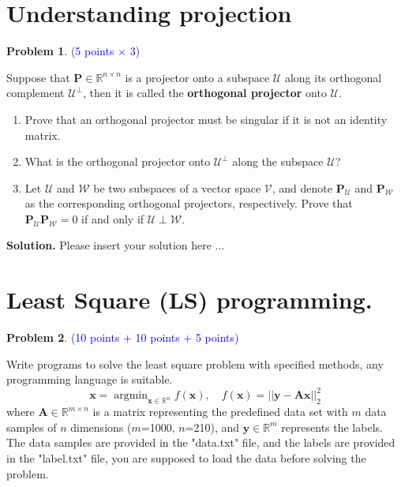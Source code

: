\documentclass[english,onecolumn]{IEEEtran}
\newcommand{\Rbb}{\mathbb{R}}
\newcommand{\Pb}{\mathbf{P}}
\newcommand{\Ucal}{\mathcal{U}}
\newcommand{\Wcal}{\mathcal{W}}
\begin{document}
\section{Understanding projection}
\noindent\textbf{Problem 1}. \textcolor{blue}{(5 points $\times$ 3)}

Suppose that $\Pb\in \Rbb^{n\times n}$ is a projector onto a subspace $\mathcal{U}$ along its orthogonal complement $\mathcal{U}^{\perp}$, then it is called the \textbf{orthogonal projector} onto $\Ucal$.
\begin{enumerate}
    \item Prove that an orthogonal projector must be singular if it is not an identity matrix.
	\item What is the orthogonal projector onto $\mathcal{U}^{\perp}$ along the subspace $\mathcal{U}$?
    \item Let $\Ucal$ and $\Wcal$ be two subspaces of a vector space $\mathcal{V}$, and denote $\Pb_{\Ucal}$ and $\Pb_{\Wcal}$ as the corresponding orthogonal projectors, respectively. Prove that $\Pb_{\Ucal} \Pb_{\Wcal} = 0$ if and only if $\Ucal \perp \Wcal$.
\end{enumerate}

\noindent
\textbf{Solution.}
Please insert your solution here ...

\newpage
\section{Least Square (LS) programming.}
\noindent\textbf{Problem 2}. \textcolor{blue}{(10 points + 10 points + 5 points)}

Write programs to solve the least square problem with specified methods, any programming language is suitable.
$$
\mathbf{x} = \mathop{\arg\min}_{\mathbf{x} \in \Rbb^n} f(\mathbf{x}), \quad f(\mathbf{x}) = ||\mathbf{y}-\mathbf{A}\mathbf{x}||_2^2
$$
where $\mathbf{A} \in \Rbb^{m \times n}$ is a matrix representing the predefined data set with $m$ data samples of $n$ dimensions ($m$=1000, $n$=210), and $\mathbf{y} \in \Rbb^m$ represents the labels. The data samples are provided in the "data.txt" file, and the labels are provided in the "label.txt" file, you are supposed to load the data before solving the problem.
\end{document}
